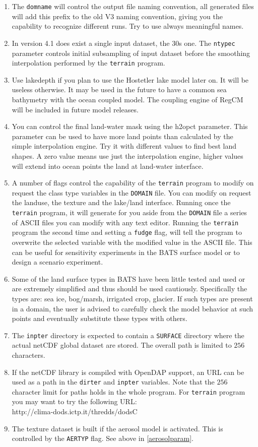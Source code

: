 \begin{enumerate}
\item The \verb=domname= will control the output file naming convention, all
generated files will add this prefix to the old V3 naming convention,
giving you the capability to recognize different runs. Try to use always
meaningful names.
\item In version 4.1 does exist a single input dataset, the 30s one. The
\verb=ntypec= parameter controls initial subsampling of input dataset before
the smoothing interpolation performed by the \verb=terrain= program.
\item Use lakedepth if you plan to use the Hostetler lake model later on.
It will be useless otherwise. It may be used in the future to
have a common sea bathymetry with the ocean coupled model. The coupling
engine of RegCM will be included in future model releases.
\item You can control the final land-water mask using the h2opct parameter.
This parameter can be used to have more land points than calculated by
the simple interpolation engine. Try it with different values to find best
land shapes. A zero value means use just the interpolation engine, higher
values will extend into ocean points the land at land-water interface.
\item A number of flags control the capability of the \verb=terrain= program
to modify on request the class type variables in the \verb=DOMAIN= file. You can
modify on request the landuse, the texture and the lake/land interface.
Running once the \verb=terrain= program, it will generate for you aside from the
\verb=DOMAIN= file a series of ASCII files you can modify with any text
editor. Running the \verb=terrain= program the second time and setting
a \verb=fudge= flag, will tell the program to overwrite the selected
variable with the modified value in the ASCII file. This can be useful
for sensitivity experiments in the BATS surface model or to design
a scenario experiment.
\item Some of the land surface types in BATS have been little tested and used
or are extremely simplified and thus should be used cautiously. Specifically
the types are: sea ice, bog/marsh, irrigated crop, glacier. If such types are
present in a domain, the user is advised to carefully check the model behavior
at such points and eventually substitute these types with others.
\item The \verb=inpter= directory is expected to contain a \verb=SURFACE=
directory where the actual netCDF global dataset are stored. The overall
path is limited to $256$ characters.
\label{pathnote}
\item If the netCDF library is compiled with OpenDAP support, an URL
can be used as a path in the \verb=dirter= and \verb=inpter= variables.
Note that the $256$ character limit for paths holds in the whole program.
For \verb=terrain= program you may want to try the following URL: \\
http://clima-dods.ictp.it/thredds/dodsC
\item The texture dataset is built if the aerosol model is activated.
This is controlled by the \verb=AERTYP= flag. See above in \ref{aerosolparam}.
\end{enumerate}


